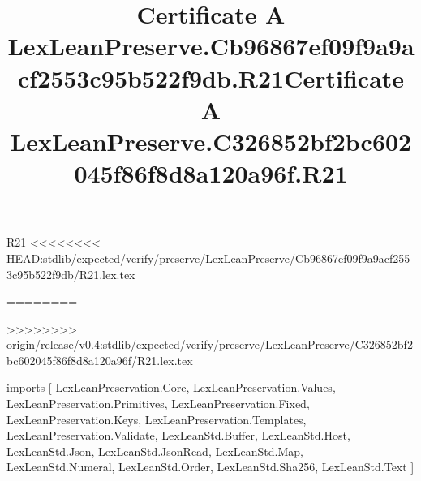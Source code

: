 \begin{lexlean}{R21}
<<<<<<<< HEAD:stdlib/expected/verify/preserve/LexLeanPreserve/Cb96867ef09f9a9acf2553c95b522f9db/R21.lex.tex
\title{Certificate A LexLeanPreserve.Cb96867ef09f9a9acf2553c95b522f9db.R21}
========
\title{Certificate A LexLeanPreserve.C326852bf2bc602045f86f8d8a120a96f.R21}
>>>>>>>> origin/release/v0.4:stdlib/expected/verify/preserve/LexLeanPreserve/C326852bf2bc602045f86f8d8a120a96f/R21.lex.tex
\begin{coremodule}
imports [
  LexLeanPreservation.Core,
  LexLeanPreservation.Values,
  LexLeanPreservation.Primitives,
  LexLeanPreservation.Fixed,
  LexLeanPreservation.Keys,
  LexLeanPreservation.Templates,
  LexLeanPreservation.Validate,
  LexLeanStd.Buffer,
  LexLeanStd.Host,
  LexLeanStd.Json,
  LexLeanStd.JsonRead,
  LexLeanStd.Map,
  LexLeanStd.Numeral,
  LexLeanStd.Order,
  LexLeanStd.Sha256,
  LexLeanStd.Text
]


\end{coremodule}
\end{lexlean}
